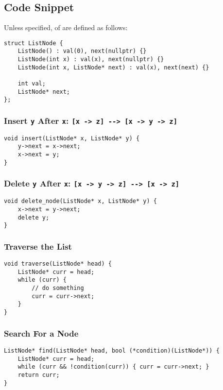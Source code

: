 \subsection{Code Snippet}
\hdashrule[0.5ex]{\linewidth}{0.5pt}{1mm 3pt}
Unless specified, {\color{blue}{nodes}} of {\color{blue}{singly linked list}} are defined as follows:
\begin{lstlisting}
struct ListNode {
	ListNode() : val(0), next(nullptr) {}
	ListNode(int x) : val(x), next(nullptr) {}
	ListNode(int x, ListNode* next) : val(x), next(next) {}
	
	int val;
	ListNode* next;
};
\end{lstlisting}
\hdashrule[0.5ex]{\linewidth}{0.5pt}{1mm 3pt}

\subsubsection*{Insert {\colorbox{CodeBackground}{\lstinline|y|}} After {\colorbox{CodeBackground}{\lstinline|x|}}: {\colorbox{CodeBackground}{\lstinline|[x -> z] --> [x -> y -> z]|}}}
\begin{lstlisting}
void insert(ListNode* x, ListNode* y) {
	y->next = x->next;
	x->next = y;
}
\end{lstlisting}

\subsubsection*{Delete {\colorbox{CodeBackground}{\lstinline|y|}} After {\colorbox{CodeBackground}{\lstinline|x|}}: {\colorbox{CodeBackground}{\lstinline|[x -> y -> z] --> [x -> z]|}}}
\begin{lstlisting}
void delete_node(ListNode* x, ListNode* y) {
	x->next = y->next;
	delete y;
}
\end{lstlisting}

\subsubsection*{Traverse the List}
\begin{lstlisting}
void traverse(ListNode* head) {
	ListNode* curr = head;
	while (curr) {
		// do something
		curr = curr->next;
	}
}
\end{lstlisting}

\subsubsection*{Search For a Node}
\begin{lstlisting}
ListNode* find(ListNode* head, bool (*condition)(ListNode*)) {
	ListNode* curr = head;
	while (curr && !condition(curr)) { curr = curr->next; }
	return curr;
}
\end{lstlisting}

